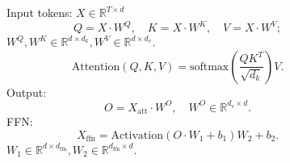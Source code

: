 \begin{frame}
\begin{figure}
\begin{minipage}[t]{0.5\textwidth}
    \end{minipage}\hfill
    \begin{minipage}[t]{0.5\textwidth}
       Input tokens: $X\in\mathbb{R}^{T\times d}$ \\
       \begin{equation}
        Q = X\cdot W^Q, \quad K = X\cdot W^K, \quad V = X\cdot W^V;
       \end{equation}
       $W^Q, W^K \in\mathbb{R}^{d\times d_k}, W^V \in\mathbb{R}^{d\times d_v}$. \\
       \begin{equation}
        \text{Attention}(Q,K,V)=\text{softmax}(\frac{QK^T}{\sqrt{d_k}})V.
       \end{equation}
       Output: $$O=X_{\text{att}}\cdot W^O, \quad W^O \in\mathbb{R}^{d_v\times d}.$$
       FFN: $$X_{\text{ffn}} = \text{Activation}(O\cdot W_1 + b_1)W_2 + b_2.$$
       $W_1 \in \mathbb{R}^{d\times d_{\text{ffn}}},
       W_2 \in \mathbb{R}^{d_{\text{ffn}}\times d}.$
    \end{minipage}
    
    
    
      \label{fig:multi-head-att}
    \end{figure}
    
\end{frame}
